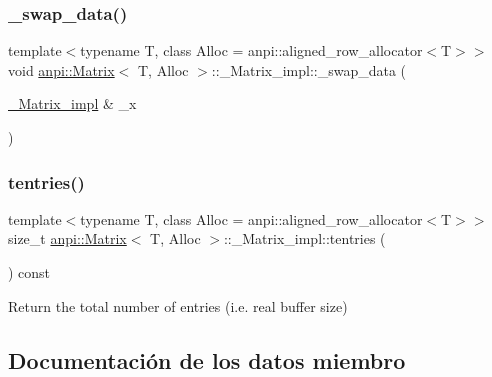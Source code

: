 \subsubsection{\texorpdfstring{\+\_\+swap\+\_\+data()}{\_swap\_data()}}
{\footnotesize\ttfamily template$<$typename T, class Alloc = anpi\+::aligned\+\_\+row\+\_\+allocator$<$\+T$>$$>$ \\
void \hyperlink{classanpi_1_1Matrix}{anpi\+::\+Matrix}$<$ T, Alloc $>$\+::\+\_\+\+Matrix\+\_\+impl\+::\+\_\+swap\+\_\+data (\begin{DoxyParamCaption}\item[{\hyperlink{structanpi_1_1Matrix_1_1__Matrix__impl}{\+\_\+\+Matrix\+\_\+impl} \&}]{\+\_\+x }\end{DoxyParamCaption})\hspace{0.3cm}{\ttfamily [noexcept]}}

\mbox{\label{structanpi_1_1Matrix_1_1__Matrix__impl_af9a5caaabb241f1acb9b275e3a0898ad}} 
\subsubsection{\texorpdfstring{tentries()}{tentries()}}
{\footnotesize\ttfamily template$<$typename T, class Alloc = anpi\+::aligned\+\_\+row\+\_\+allocator$<$\+T$>$$>$ \\
size\+\_\+t \hyperlink{classanpi_1_1Matrix}{anpi\+::\+Matrix}$<$ T, Alloc $>$\+::\+\_\+\+Matrix\+\_\+impl\+::tentries (\begin{DoxyParamCaption}{ }\end{DoxyParamCaption}) const\hspace{0.3cm}{\ttfamily [inline]}}



Return the total number of entries (i.\+e. real buffer size) 



\subsection{Documentación de los datos miembro}
\mbox{\label{structanpi_1_1Matrix_1_1__Matrix__impl_a0449efda7c550cf9a8329d40240237a3}} 
